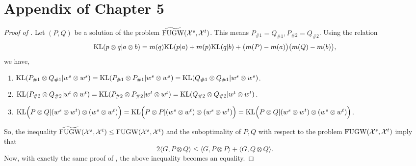\section{Appendix of Chapter 5}

\begin{proof}[Proof of ]
  Let $(P, Q)$ be a solution of the problem $\widetilde{\text{FUGW}}(\mathcal X^s, \mathcal X^t)$.
  This means $P_{\#1} = Q_{\#1}, P_{\#2} = Q_{\#2}$. Using the relation
  \begin{align}
    \text{KL}(p \otimes q | a \otimes b) = m(q) \text{KL}(p | a) + m(p) \text{KL}(q | b)
    + \big(m(P) - m(a)\big) \big(m(Q) - m(b)\big),
  \end{align}
  we have,
  \begin{enumerate}
    \item $\text{KL}(P_{\#1} \otimes Q_{\#1} \vert w^s \otimes w^s) =
    \text{KL}(P_{\#1} \otimes P_{\#1} \vert w^s \otimes w^s) =
    \text{KL}(Q_{\#1} \otimes Q_{\#1} \vert w^s \otimes w^s)$.

    \item $\text{KL}(P_{\#2} \otimes Q_{\#2} \vert w^t \otimes w^t) =
  \text{KL}(P_{\#2} \otimes P_{\#2} \vert w^t \otimes w^t) =
  \text{KL}(Q_{\#2} \otimes Q_{\#2} \vert w^t \otimes w^t)$.

    \item $\text{KL} \Big(P \otimes Q | (w^s \otimes w^t) \otimes (w^s \otimes w^t) \Big) =
    \text{KL} \Big(P \otimes P | (w^s \otimes w^t) \otimes (w^s \otimes w^t) \Big)
    = \text{KL} \Big(P \otimes Q | (w^s \otimes w^t) \otimes (w^s \otimes w^t) \Big)$.
  \end{enumerate}
  So, the inequality $\widetilde{\text{FUGW}}(\mathcal X^s, \mathcal X^t) \leq \text{FUGW}(\mathcal X^s, \mathcal X^t)$ and
  the suboptimality of $P, Q$ with respect to the problem $\text{FUGW}(\mathcal X^s, \mathcal X^t)$ imply that
  \begin{equation}
    2 \langle G, P \otimes Q \rangle \leq
      \langle G, P \otimes P \rangle + \langle G, Q \otimes Q \rangle.
  \end{equation}
  Now, with exactly the same proof of ,
  the above inequality becomes an equality.
\end{proof}


